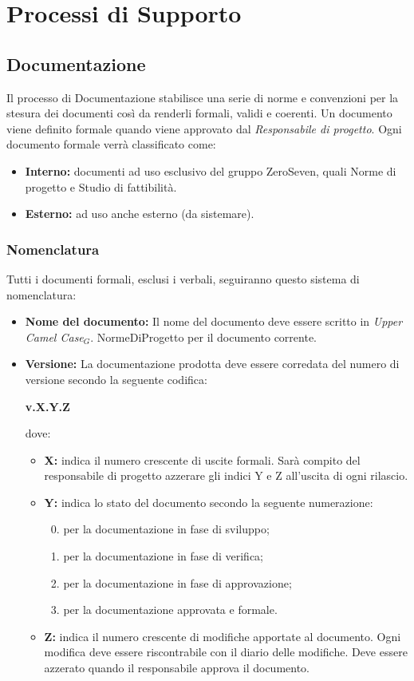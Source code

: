 \section{Processi di Supporto}
\subsection{Documentazione}
Il processo di Documentazione stabilisce una serie di norme e convenzioni per la stesura dei documenti così da renderli formali, validi e coerenti.
Un documento viene definito formale quando viene approvato dal \textit{Responsabile di progetto}.
Ogni documento formale verrà classificato come:
\begin{itemize}
	\item \textbf{Interno:} documenti ad uso esclusivo del gruppo ZeroSeven, quali Norme di progetto e Studio di fattibilità.  
	\item \textbf{Esterno:} ad uso anche esterno (da sistemare). 
	
\end{itemize}

\subsubsection{Nomenclatura}
Tutti i documenti formali, esclusi i verbali, seguiranno questo sistema di nomenclatura:
\begin{itemize}
	\item \textbf{Nome del documento:} Il nome del documento deve essere scritto in \textit{Upper Camel Case$_{G}$}.
	NormeDiProgetto per il documento corrente. 
	\item \textbf{Versione:} La documentazione prodotta deve essere corredata del numero di versione secondo la seguente codifica:
	
	\textbf{v.X.Y.Z}
	
	dove:
	\begin{itemize}
		\item \textbf{X:} indica il numero crescente di uscite formali. Sarà compito del responsabile di progetto azzerare gli indici Y e Z all'uscita di ogni rilascio.
		\item \textbf{Y:} indica lo stato del documento secondo la seguente numerazione:
		\begin{enumerate}
			\setcounter{enumi}{-1}
			\item per la documentazione in fase di sviluppo;
			\item per la documentazione in fase di verifica;
			\item per la documentazione in fase di approvazione;
			\item per la documentazione approvata e formale.
		\end{enumerate}
		\item \textbf{Z:} indica il numero crescente di modifiche apportate al documento. Ogni modifica deve essere riscontrabile con il diario delle modifiche. Deve essere azzerato quando il responsabile approva il documento. 	
	\end{itemize}
\end{itemize}

